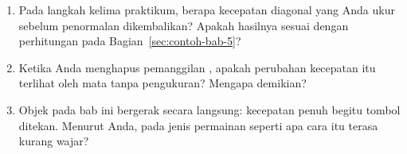\begin{refleksibox}
\begin{enumerate}
  \item Pada langkah kelima praktikum, berapa kecepatan diagonal yang Anda
        ukur sebelum penormalan dikembalikan? Apakah hasilnya sesuai dengan
        perhitungan pada Bagian~\ref{sec:contoh-bab-5}?
  \item Ketika Anda menghapus pemanggilan , apakah perubahan
        kecepatan itu terlihat oleh mata tanpa pengukuran? Mengapa demikian?
  \item Objek pada bab ini bergerak secara langsung: kecepatan penuh begitu
        tombol ditekan. Menurut Anda, pada jenis permainan seperti apa cara
        itu terasa kurang wajar?
\end{enumerate}
\end{refleksibox}
